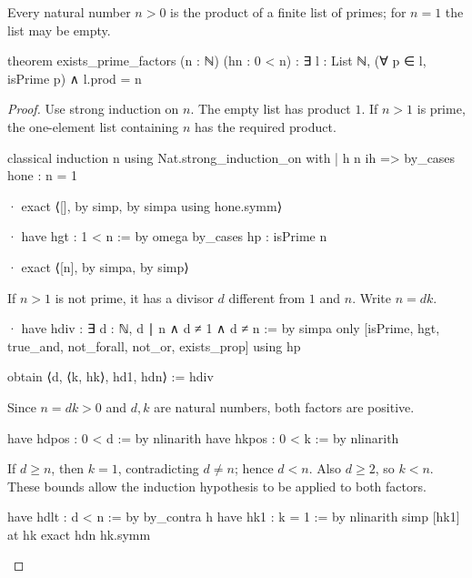 \begin{lemma}
  \label{ent:lem:prime-factor-existence}
  Every natural number $n>0$ is the product of a finite list of primes; for $n=1$ the list may be
  empty.

  \begin{lean}
    theorem exists_prime_factors (n : ℕ) (hn : 0 < n) :
        ∃ l : List ℕ, (∀ p ∈ l, isPrime p) ∧ l.prod = n
  \end{lean}
\end{lemma}

\begin{proof}
  Use strong induction on $n$.
  The empty list has product $1$.
  If $n>1$ is prime, the one-element list containing $n$ has the required product.

  \begin{lean}
    classical
    induction n using Nat.strong_induction_on with
    | h n ih =>
      by_cases hone : n = 1

      · exact ⟨[], by simp, by simpa using hone.symm⟩

      · have hgt : 1 < n := by
          omega
        by_cases hp : isPrime n

        · exact ⟨[n], by simpa, by simp⟩
  \end{lean}

  If $n>1$ is not prime, it has a divisor $d$ different from $1$ and $n$.
  Write $n=dk$.

  \begin{lean}
    · have hdiv : ∃ d : ℕ, d ∣ n ∧ d ≠ 1 ∧ d ≠ n := by
        simpa only [isPrime, hgt, true_and, not_forall, not_or, exists_prop] using hp

      obtain ⟨d, ⟨k, hk⟩, hd1, hdn⟩ := hdiv
  \end{lean}

  Since $n=dk>0$ and $d,k$ are natural numbers, both factors are positive.

  \begin{lean}
    have hdpos : 0 < d := by
      nlinarith
    have hkpos : 0 < k := by
      nlinarith
  \end{lean}

  If $d\ge n$, then $k=1$, contradicting $d\ne n$; hence $d<n$.
  Also $d\ge2$, so $k<n$.
  These bounds allow the induction hypothesis to be applied to both factors.

  \begin{lean}
    have hdlt : d < n := by
      by_contra h
      have hk1 : k = 1 := by
        nlinarith
      simp [hk1] at hk
      exact hdn hk.symm


\end{lean}
\end{proof}
